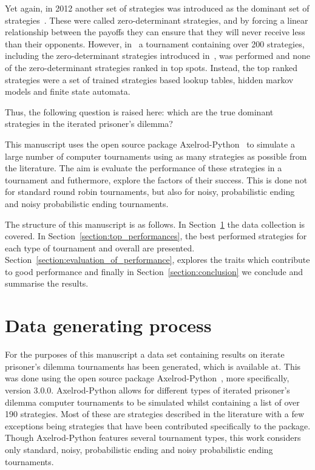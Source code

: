 \documentclass{article}
\begin{document}
Yet again, in 2012 another set of strategies was introduced as the dominant set
of strategies~\cite{Press2012}. These were called zero-determinant strategies,
and by forcing a linear relationship between the payoffs they can ensure that
they will never receive less than their opponents. However, in~\cite{Harper2017}
a tournament containing over 200 strategies, including the zero-determinant strategies
introduced in~\cite{Press2012}, was performed and none of the zero-determinant
strategies ranked in top spots. Instead, the top ranked strategies were a set of
trained strategies based lookup tables, hidden markov models and finite state
automata.

Thus, the following question is raised here: which are the true dominant
strategies in the iterated prisoner's dilemma?

This manuscript uses the open source package
Axelrod-Python~\cite{axelrodproject} to simulate a large number of computer
tournaments using as many strategies as possible from the literature. The aim is
evaluate the performance of these strategies in a tournament and futhermore,
explore the factors of their success. This is done not for standard round robin
tournaments, but also for noisy, probabilistic ending and noisy probabilistic
ending tournaments.

The structure of this manuscript is as follows. In
Section~\ref{section:data_collection} the data collection is covered. In
Section~\ref{section:top_performances}, the best performed strategies for each
type of tournament and overall are presented.
Section~\ref{section:evaluation_of_performance}, explores the traits which
contribute to good performance and finally in Section~\ref{section:conclusion}
we conclude and summarise the results.

\section{Data generating process}\label{section:data_collection}

For the purposes of this manuscript a data set containing results on iterate
prisoner's dilemma tournaments has been generated, which is available at. This
was done using the open source package Axelrod-Python~\cite{axelrodproject},
more specifically, version 3.0.0. Axelrod-Python allows for different types of
iterated prisoner's dilemma computer tournaments to be simulated whilst
containing a list of over 190 strategies. Most of these are strategies described
in the literature with a few exceptions being strategies that have been
contributed specifically to the package. Though Axelrod-Python features several
tournament types, this work considers only standard, noisy, probabilistic ending
and noisy probabilistic ending tournaments.
\end{document}
